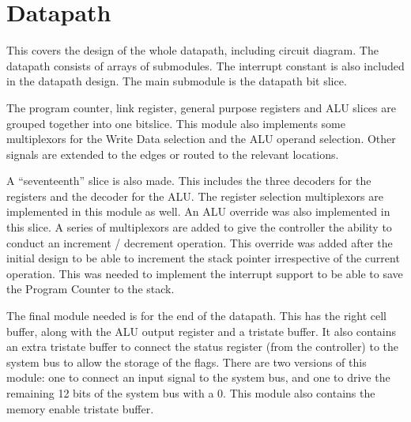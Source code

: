

\section{Datapath}

This covers the design of the whole datapath, including circuit diagram.
The datapath consists of arrays of submodules. 
The interrupt constant is also included in the datapath design.
The main submodule is the datapath bit slice. 


The program counter, link register, general purpose registers and ALU slices are grouped together into one bitslice.
This module also implements some multiplexors for the Write Data selection and the ALU operand selection.
Other signals are extended to the edges or routed to the relevant locations. 

A ``seventeenth'' slice is also made. 
This includes the three decoders for the registers and the decoder for the ALU.
The register selection multiplexors are implemented in this module as well.
An ALU override was also implemented in this slice.
A series of multiplexors are added to give the controller the ability to conduct an increment / decrement operation. 
This override was added after the initial design to be able to increment the stack pointer irrespective of the current operation.
This was needed to implement the interrupt support to be able to save the Program Counter to the stack.

The final module needed is for the end of the datapath. 
This has the right cell buffer, along with the ALU output register and a tristate buffer.
It also contains an extra tristate buffer to connect the status register (from the controller) to the system bus to allow the storage of the flags.
There are two versions of this module: one to connect an input signal to the system bus, and one to drive the remaining 12 bits of the system bus with a 0. 
This module also contains the memory enable tristate buffer.


